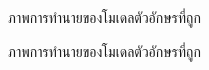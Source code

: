 \documentclass[12pt,oneside,openright,a4paper]{cpe-thai-project}
\begin{document}
  \begin{figure}[!h]\centering
    \setlength{\fboxrule}{0.2mm} %
    \setlength{\fboxsep}{1cm}
    \caption{ภาพการทำนายของโมเดลตัวอักษรที่ถูก}\label{fig:system}                  
   \end{figure}
   \newpage
   \begin{figure}[!h]\centering
    \setlength{\fboxrule}{0.2mm} %
    \setlength{\fboxsep}{1cm}
    \caption{ภาพการทำนายของโมเดลตัวอักษรที่ถูก}\label{fig:system}                  
   \end{figure}
\end{document}
